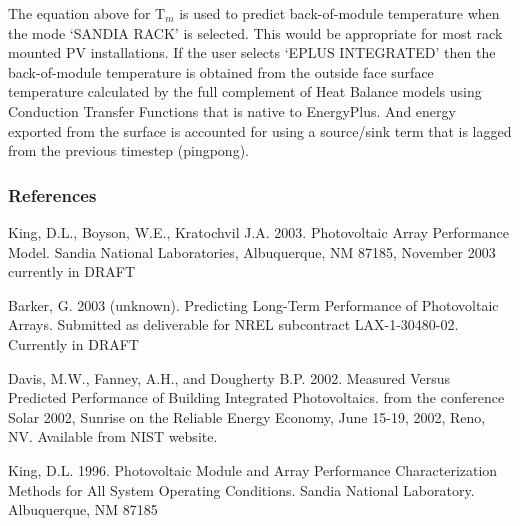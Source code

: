 The equation above for T\(_{m}\) is used to predict back-of-module temperature when the mode `SANDIA RACK' is selected. This would be appropriate for most rack mounted PV installations. If the user selects `EPLUS INTEGRATED' then the back-of-module temperature is obtained from the outside face surface temperature calculated by the full complement of Heat Balance models using Conduction Transfer Functions that is native to EnergyPlus. And energy exported from the surface is accounted for using a source/sink term that is lagged from the previous timestep (pingpong).

\subsubsection{References}\label{references-1-014}

King, D.L., Boyson, W.E., Kratochvil J.A. 2003. Photovoltaic Array Performance Model. Sandia National Laboratories, Albuquerque, NM 87185, November 2003~ currently in DRAFT

Barker, G. 2003 (unknown). Predicting Long-Term Performance of Photovoltaic Arrays. Submitted as deliverable for NREL subcontract LAX-1-30480-02. Currently in DRAFT

Davis, M.W., Fanney, A.H., and Dougherty B.P. 2002. Measured Versus Predicted Performance of Building Integrated Photovoltaics. from the conference Solar 2002, Sunrise on the Reliable Energy Economy, June 15-19, 2002, Reno, NV. Available from NIST website.

King, D.L. 1996. Photovoltaic Module and Array Performance Characterization Methods for All System Operating Conditions. Sandia National Laboratory. Albuquerque, NM 87185
